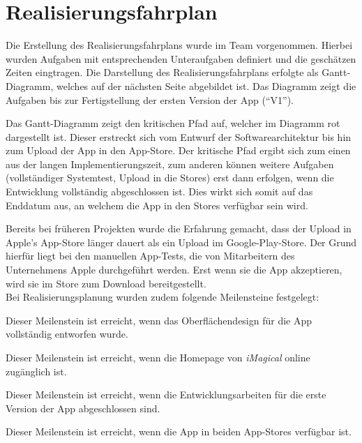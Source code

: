 \chapter{Realisierungsfahrplan}

Die Erstellung des Realisierungsfahrplans wurde im Team vorgenommen.
Hierbei wurden Aufgaben mit entsprechenden Unteraufgaben definiert und die geschätzen Zeiten eingtragen.
Die Darstellung des Realisierungsfahrplans erfolgte als Gantt-Diagramm, welches auf der nächsten Seite abgebildet ist.
Das Diagramm zeigt die Aufgaben bis zur Fertigstellung der ersten Version der App (``V1'').

Das Gantt-Diagramm zeigt den kritischen Pfad auf, welcher im Diagramm rot dargestellt ist.
Dieser erstreckt sich vom Entwurf der Softwarearchitektur bis hin zum Upload der App in den App-Store.
Der kritische Pfad ergibt sich zum einen aus der langen Implementierungszeit, zum anderen können weitere Aufgaben (vollständiger Systemtest, Upload in die Stores) erst dann erfolgen, wenn die Entwicklung vollständig abgeschlossen ist.
Dies wirkt sich somit auf das Enddatum aus, an welchem die App in den Stores verfügbar sein wird.

Bereits bei früheren Projekten wurde die Erfahrung gemacht, dass der Upload in Apple's App-Store länger dauert als ein Upload im Google-Play-Store. Der Grund hierfür liegt bei den manuellen App-Tests, die von Mitarbeitern des Unternehmens Apple durchgeführt werden. Erst wenn sie die App akzeptieren, wird sie im Store zum Download bereitgestellt. \\

Bei Realisierungsplanung wurden zudem folgende Meilensteine festgelegt:
\begin{description}[leftmargin=!,labelwidth=\widthof{\bfseries KONZEPTION APP UI}]
\item [KONZEPTION APP-UI] Dieser Meilenstein ist erreicht, wenn das Oberflächendesign für die App vollständig entworfen wurde.
\item [WEBSEITE LIVE] Dieser Meilenstein ist erreicht, wenn die Homepage von \textit{iMagical} online zugänglich ist.
\item [APP V1] Dieser Meilenstein ist erreicht, wenn die Entwicklungsarbeiten für die erste Version der App abgeschlossen sind.
\item [APP ONLINE] Dieser Meilenstein ist erreicht, wenn die App in beiden App-Stores verfügbar ist.
\end{description}

 

